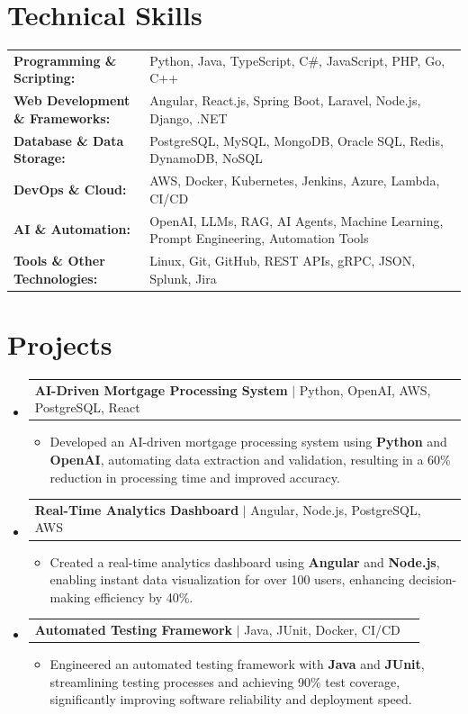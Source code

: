 \documentclass[letterpaper,10pt]{article}
\makeatletter
\newcommand{\resumeItem}[1]{
  \item{\fontsize{8pt}{9pt}\selectfont
    #1 \vspace{-3pt}
  }
}
\newcommand{\resumeProjectHeading}[2]{
    \item
    \begin{tabular*}{1.001\textwidth}{l@{\extracolsep{\fill}}r}
      \fontsize{8.5pt}{10pt}#1 & \textbf{\fontsize{8.5pt}{10pt} #2}\\
    \end{tabular*}\vspace{-7pt}
}
\newcommand{\resumeSubHeadingListStart}{\begin{itemize}[leftmargin=0pt, label={}]}
\newcommand{\resumeSubHeadingListEnd}{\end{itemize}}
\newcommand{\resumeItemListStart}{\begin{itemize}[leftmargin=*]}
\newcommand{\resumeItemListEnd}{\end{itemize}\vspace{-5pt}}
\makeatother
\begin{document}
\section{Technical Skills}
        \vspace{-14pt}
        \begin{table}[h]
            \fontsize{8pt}{9pt}\selectfont
            \begin{tabular}{p{0.3\linewidth} p{0.7\linewidth}}
                \textbf{Programming \& Scripting:} & Python, Java, TypeScript, C\#, JavaScript, PHP, Go, C++ \\
                \textbf{Web Development \& Frameworks:} & Angular, React.js, Spring Boot, Laravel, Node.js, Django, .NET \\
                \textbf{Database \& Data Storage:} & PostgreSQL, MySQL, MongoDB, Oracle SQL, Redis, DynamoDB, NoSQL \\
                \textbf{DevOps \& Cloud:} & AWS, Docker, Kubernetes, Jenkins, Azure, Lambda, CI/CD \\
                \textbf{AI \& Automation:} & OpenAI, LLMs, RAG, AI Agents, Machine Learning, Prompt Engineering, Automation Tools \\
                \textbf{Tools \& Other Technologies:} & Linux, Git, GitHub, REST APIs, gRPC, JSON, Splunk, Jira \\
            \end{tabular}
        \end{table}
 \vspace{-18pt}

\section{Projects}
    \vspace{-5pt}
    \resumeSubHeadingListStart
          \resumeProjectHeading
            {\textbf{AI-Driven Mortgage Processing System} $|$ Python, OpenAI, AWS, PostgreSQL, React}{}
            \resumeItemListStart
                \resumeItem{Developed an AI-driven mortgage processing system using \textbf{Python} and \textbf{OpenAI}, automating data extraction and validation, resulting in a 60\% reduction in processing time and improved accuracy.}
            \resumeItemListEnd
        \vspace{-12pt}
    
        \resumeProjectHeading
            {\textbf{Real-Time Analytics Dashboard} $|$ Angular, Node.js, PostgreSQL, AWS}{}
        \resumeItemListStart
                \resumeItem{Created a real-time analytics dashboard using \textbf{Angular} and \textbf{Node.js}, enabling instant data visualization for over 100 users, enhancing decision-making efficiency by 40\%.}
        \resumeItemListEnd
      \vspace{-12pt}
      \resumeProjectHeading
        {\textbf{Automated Testing Framework} $|$ Java, JUnit, Docker, CI/CD}{}
    \resumeItemListStart
            \resumeItem{Engineered an automated testing framework with \textbf{Java} and \textbf{JUnit}, streamlining testing processes and achieving 90\% test coverage, significantly improving software reliability and deployment speed.}
    \resumeItemListEnd
    \resumeSubHeadingListEnd
\end{document}
